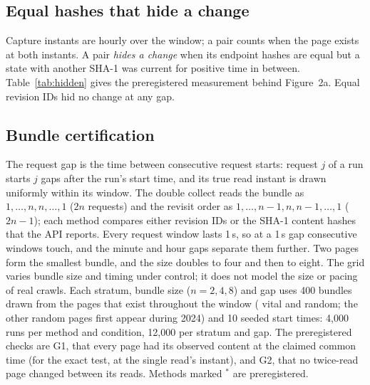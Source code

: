 \subsection{Equal hashes that hide a change}
Capture instants are hourly over the window; a pair counts when the page
exists at both instants. A pair \emph{hides a change} when its endpoint hashes
are equal but a state with another SHA-1 was current for positive time in
between. Table~\ref{tab:hidden} gives the preregistered measurement behind
Figure~2a. Equal revision IDs hid no change at any gap.

\begin{table}[t]
\caption{Equal-hash revisit pairs that hid a change, with 95\% bootstrap intervals over pages (2{,}000 resamples, seed 7).}
\label{tab:hidden}
\small

\end{table}

\subsection{Bundle certification}
The request gap is the time between consecutive request starts: request $j$ of
a run starts $j$ gaps after the run's start time, and its true read instant is
drawn uniformly within its window. The double collect reads the bundle as
$1,\ldots,n,n,\ldots,1$ ($2n$ requests) and the revisit order as
$1,\ldots,n-1,n,n-1,\ldots,1$ ($2n-1$); each method compares either revision
IDs or the SHA-1 content hashes that the API reports. Every request
window lasts 1\,s, so at a 1\,s gap consecutive windows touch, and the minute
and hour gaps separate them further. Two pages form the smallest bundle, and the
size doubles to four and then to eight. The grid varies bundle size and timing under control; it
does not model the size or pacing of real crawls. Each stratum, bundle size ($n=2,4,8$) and gap uses 400 bundles drawn from the
pages that exist throughout the window (\sPoolVital{} vital and \sPoolRandom{}
random; the other \sPoolRandomLate{} random pages first appear during 2024) and
10 seeded start times: 4{,}000 runs per method and
condition, 12{,}000 per stratum and gap. The preregistered checks are G1, that
every page had its observed content at the claimed common time (for the exact
test, at the single read's instant), and G2, that no twice-read page changed
between its reads. Methods marked $^{\ast}$ are preregistered.

\begin{table}[t]
\caption{Preregistered methods: certified runs and runs violating G1 and G2. Rows ``all $n$'' total 12{,}000 runs over $n=2,4,8$; the last three rows split vital pages at 1\,h by bundle size (4{,}000 runs each).}
\label{tab:prereg}
\small

\end{table}


